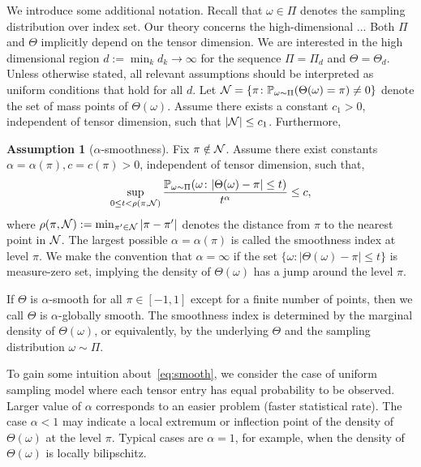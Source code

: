 \documentclass{article}
\theoremstyle{plain}
\theoremstyle{definition}
\newtheorem{assumption}{Assumption}
\begin{document}
We introduce some additional notation. Recall that $\omega\in \Pi$ denotes the sampling distribution over index set. Our theory concerns the high-dimensional ... Both $\Pi$ and $\Theta$ implicitly depend on the tensor dimension. We are interested in the high dimensional region $d:=\min_kd_k\to\infty$ for the sequence $\Pi=\Pi_d$ and $\Theta=\Theta_d$. Unless otherwise stated, all relevant assumptions should be interpreted as uniform conditions that hold for all $d$. 
Let $\mathcal{N}=\{\pi\colon \mathbb{P}_{\omega\sim \Pi}(\Theta(\omega)=\pi)\neq 0\}$ denote the set of mass points of $\Theta(\omega)$. Assume there exists a constant $c_1>0$, independent of tensor dimension, such that $|\mathcal{N}|\leq c_1$. Furthermore, 

\begin{assumption}[$\alpha$-smoothness]\label{ass:margin} 
Fix $\pi\notin \mathcal{N}$. Assume there exist constants $\alpha=\alpha(\pi), c=c(\pi) >0$, independent of tensor dimension, such that, 
\begin{equation}\label{eq:smooth}
\sup_{0\leq t<\rho(\pi, \mathcal{N})}{\mathbb{P}_{\omega \sim \Pi}(\omega \colon |\Theta (\omega)-\pi|\leq t )\over t^\alpha} \leq c,
\end{equation}
where $\rho(\pi,\mathcal{N}):=\min_{\pi'\in \mathcal{N}}|\pi-\pi'|$ denotes the distance from $\pi$ to the nearest point in $\mathcal{N}$. The largest possible $\alpha=\alpha(\pi)$ is called the smoothness index at level $\pi$. We make the convention that $\alpha= \infty$ if the set $\{\omega\colon |\Theta(\omega)-\pi|\leq t\}$ is measure-zero set, implying the density of $\Theta(\omega)$ has a jump around the level $\pi$.
\end{assumption}

If $\Theta$ is $\alpha$-smooth for all $\pi\in[-1,1]$ except for a finite number of points, then we call $\Theta$ is $\alpha$-globally smooth. 
The smoothness index is determined by the marginal density of $\Theta(\omega)$, or equivalently, by the underlying $\Theta$ and the sampling distribution $\omega\sim \Pi$. 

To gain some intuition about~\eqref{eq:smooth}, we consider the case of uniform sampling model where each tensor entry has equal probability to be observed. Larger value of $\alpha$ corresponds to an easier problem (faster statistical rate). The case $\alpha<1$ may indicate a local extremum or inflection point of the density of $\Theta(\omega)$ at the level $\pi$. Typical cases are $\alpha=1$, for example, when the density of $\Theta(\omega)$ is locally bilipschitz. 
\end{document}
